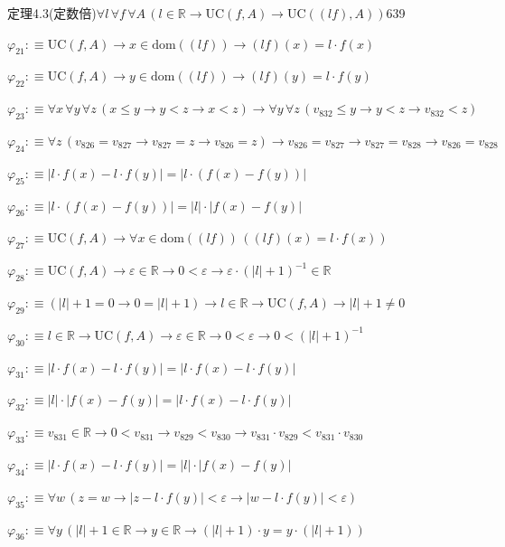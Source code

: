 \begin{fullproof}{定理4.3(定数倍)}{$\forall l\,\forall f\,\forall A\,(l \in \mathbb{R} \to \mathrm{UC}(f,A) \to \mathrm{UC}((l f),A))$}{639}
\begin{abbrevlist}
\item $\varphi_{21} :\equiv \mathrm{UC}(f,A) \to x \in \mathrm{dom}((l f)) \to (l f)(x) = l \cdot f(x)$
\item $\varphi_{22} :\equiv \mathrm{UC}(f,A) \to y \in \mathrm{dom}((l f)) \to (l f)(y) = l \cdot f(y)$
\item $\varphi_{23} :\equiv \forall x\,\forall y\,\forall z\,(x \leq y \to y < z \to x < z) \to \forall y\,\forall z\,(v_{832} \leq y \to y < z \to v_{832} < z)$
\item $\varphi_{24} :\equiv \forall z\,(v_{826} = v_{827} \to v_{827} = z \to v_{826} = z) \to v_{826} = v_{827} \to v_{827} = v_{828} \to v_{826} = v_{828}$
\item $\varphi_{25} :\equiv \lvert l \cdot f(x) - l \cdot f(y) \rvert = \lvert l \cdot (f(x) - f(y)) \rvert$
\item $\varphi_{26} :\equiv \lvert l \cdot (f(x) - f(y)) \rvert = \lvert l \rvert \cdot \lvert f(x) - f(y) \rvert$
\item $\varphi_{27} :\equiv \mathrm{UC}(f,A) \to \forall x \in \mathrm{dom}((l f))\,((l f)(x) = l \cdot f(x))$
\item $\varphi_{28} :\equiv \mathrm{UC}(f,A) \to \varepsilon \in \mathbb{R} \to 0 < \varepsilon \to \varepsilon \cdot (\lvert l \rvert + 1)^{-1} \in \mathbb{R}$
\item $\varphi_{29} :\equiv (\lvert l \rvert + 1 = 0 \to 0 = \lvert l \rvert + 1) \to l \in \mathbb{R} \to \mathrm{UC}(f,A) \to \lvert l \rvert + 1 \neq 0$
\item $\varphi_{30} :\equiv l \in \mathbb{R} \to \mathrm{UC}(f,A) \to \varepsilon \in \mathbb{R} \to 0 < \varepsilon \to 0 < (\lvert l \rvert + 1)^{-1}$
\item $\varphi_{31} :\equiv \lvert l \cdot f(x) - l \cdot f(y) \rvert = \lvert l \cdot f(x) - l \cdot f(y) \rvert$
\item $\varphi_{32} :\equiv \lvert l \rvert \cdot \lvert f(x) - f(y) \rvert = \lvert l \cdot f(x) - l \cdot f(y) \rvert$
\item $\varphi_{33} :\equiv v_{831} \in \mathbb{R} \to 0 < v_{831} \to v_{829} < v_{830} \to v_{831} \cdot v_{829} < v_{831} \cdot v_{830}$
\item $\varphi_{34} :\equiv \lvert l \cdot f(x) - l \cdot f(y) \rvert = \lvert l \rvert \cdot \lvert f(x) - f(y) \rvert$
\item $\varphi_{35} :\equiv \forall w\,(z = w \to \lvert z - l \cdot f(y) \rvert < \varepsilon \to \lvert w - l \cdot f(y) \rvert < \varepsilon)$
\item $\varphi_{36} :\equiv \forall y\,(\lvert l \rvert + 1 \in \mathbb{R} \to y \in \mathbb{R} \to (\lvert l \rvert + 1) \cdot y = y \cdot (\lvert l \rvert + 1))$

\end{abbrevlist}
\end{fullproof}
